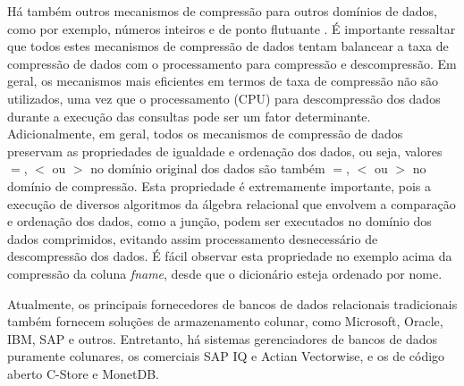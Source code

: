 Há também outros mecanismos de compressão para outros domínios de dados, como por exemplo, números inteiros e de ponto 
flutuante \citep{Abadi2006, Zukowski2006}. É importante ressaltar que todos estes mecanismos de 
compressão de dados tentam balancear a taxa de compressão de dados com o processamento para compressão
e descompressão. Em geral, os mecanismos mais eficientes em termos de taxa de compressão não são utilizados,
uma vez que o processamento (CPU) para descompressão dos dados durante a execução das consultas
pode ser um fator determinante. Adicionalmente, em geral, todos os mecanismos de compressão de dados
preservam as propriedades de igualdade e ordenação dos dados, ou seja, valores $=$, $<$ ou $>$ no domínio original
dos dados são também $=$, $<$ ou $>$ no domínio de compressão. Esta propriedade é extremamente importante, 
pois a execução de diversos algoritmos da álgebra relacional que envolvem a comparação e ordenação dos
dados, como a junção, podem ser executados no domínio dos dados comprimidos, evitando assim processamento 
desnecessário de descompressão dos dados. É fácil observar esta propriedade no exemplo acima da compressão
da coluna \emph{fname}, desde que o dicionário esteja ordenado por nome.

Atualmente, os principais fornecedores de bancos de dados relacionais tradicionais também fornecem 
soluções de armazenamento colunar, como Microsoft, Oracle, IBM, SAP e outros. Entretanto, há sistemas
gerenciadores de bancos de dados puramente colunares, os comerciais SAP IQ e Actian Vectorwise, e os
de código aberto C-Store e MonetDB.
  


